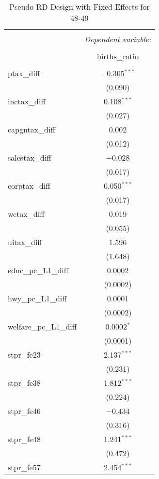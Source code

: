 
\begin{table}[!htbp] \centering 
  \caption{Pseudo-RD Design with Fixed Effects for  48-49} 
  \label{} 
\begin{tabular}{@{\extracolsep{5pt}}lc} 
\\[-1.8ex]\hline 
\hline \\[-1.8ex] 
 & \multicolumn{1}{c}{\textit{Dependent variable:}} \\ 
\cline{2-2} 
\\[-1.8ex] & births\_ratio \\ 
\hline \\[-1.8ex] 
 ptax\_diff & $-$0.305$^{***}$ \\ 
  & (0.090) \\ 
  inctax\_diff & 0.108$^{***}$ \\ 
  & (0.027) \\ 
  capgntax\_diff & 0.002 \\ 
  & (0.012) \\ 
  salestax\_diff & $-$0.028 \\ 
  & (0.017) \\ 
  corptax\_diff & 0.050$^{***}$ \\ 
  & (0.017) \\ 
  wctax\_diff & 0.019 \\ 
  & (0.055) \\ 
  uitax\_diff & 1.596 \\ 
  & (1.648) \\ 
  educ\_pc\_L1\_diff & 0.0002 \\ 
  & (0.0002) \\ 
  hwy\_pc\_L1\_diff & 0.0001 \\ 
  & (0.0002) \\ 
  welfare\_pc\_L1\_diff & 0.0002$^{*}$ \\ 
  & (0.0001) \\ 
  stpr\_fe23 & 2.137$^{***}$ \\ 
  & (0.231) \\ 
  stpr\_fe38 & 1.812$^{***}$ \\ 
  & (0.224) \\ 
  stpr\_fe46 & $-$0.434 \\ 
  & (0.316) \\ 
  stpr\_fe48 & 1.241$^{***}$ \\ 
  & (0.472) \\ 
  stpr\_fe57 & 2.454$^{***}$ \\ 

\end{tabular}
\end{table}
